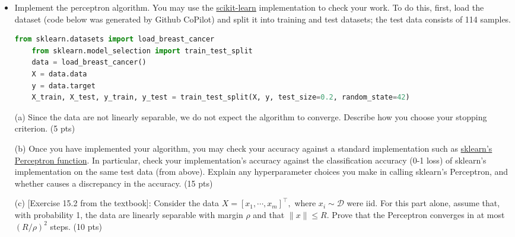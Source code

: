 \documentclass[12pt]{article}
\begin{document}
\begin{itemize}
	\item Implement the perceptron algorithm. You may use the \href{https://scikit-learn.org/stable/modules/generated/sklearn.linear_model.Perceptron.html}{scikit-learn} implementation to check your work. To do this, first, load the dataset (code below was generated by Github CoPilot) and split it into training and test datasets; the test data consists of 114 samples.
	\begin{lstlisting}[language=Python]
	from sklearn.datasets import load_breast_cancer
	from sklearn.model_selection import train_test_split
	data = load_breast_cancer()
	X = data.data
	y = data.target
	X_train, X_test, y_train, y_test = train_test_split(X, y, test_size=0.2, random_state=42)
	\end{lstlisting}
	\item[(a)] Since the data are not linearly separable, we do not expect the algorithm to converge. Describe how you choose your stopping criterion. (5 pts)
	\item[(b)] Once you have implemented your algorithm, you may check your accuracy against a standard implementation such as \href{https://scikit-learn.org/stable/modules/generated/sklearn.linear_model.Perceptron.html}{sklearn's Perceptron function}. In particular, check your implementation's accuracy against the classification accuracy (0-1 loss) of sklearn's implementation on the same test data (from above). Explain any hyperparameter choices you make in calling sklearn's Perceptron, and whether causes a discrepancy in the accuracy. (15 pts)
	\item[(c)] [Exercise 15.2 from the textbook]: 
		Consider the data $X = [x_1,\cdots, x_m]^\top,$ where $x_i \sim \mathcal{D}$ were iid. For this part alone, assume that, with probability 1, the data are linearly separable with margin $\rho$ and that $\|x\|\leq R$. Prove that the Perceptron converges in at most $(R/\rho)^2$ steps. (10 pts)
	

\end{itemize}
\end{document}
